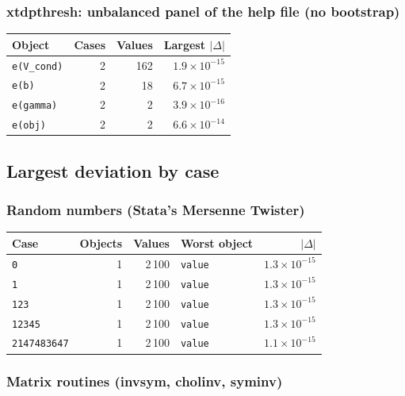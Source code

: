 \subsubsection*{xtdpthresh: unbalanced panel of the help file (no bootstrap)}

\begin{longtable}{@{}p{8.2cm}rrr@{}}
\toprule
Object & Cases & Values & Largest $|\Delta|$ \\
\midrule
\endhead
\texttt{e(V\_\allowbreak{}cond)} & 2 & 162 & $1.9\times10^{-15}$ \\
\texttt{e(b)} & 2 & 18 & $6.7\times10^{-15}$ \\
\texttt{e(gamma)} & 2 & 2 & $3.9\times10^{-16}$ \\
\texttt{e(obj)} & 2 & 2 & $6.6\times10^{-14}$ \\
\bottomrule
\end{longtable}

\subsection{Largest deviation by case}

\subsubsection*{Random numbers (Stata's Mersenne Twister)}

\begin{longtable}{@{}p{3.6cm}rrp{4.9cm}r@{}}
\toprule
Case & Objects & Values & Worst object & $|\Delta|$ \\
\midrule
\endhead
\texttt{0} & 1 & 2\,100 & \texttt{value} & $1.3\times10^{-15}$ \\
\texttt{1} & 1 & 2\,100 & \texttt{value} & $1.3\times10^{-15}$ \\
\texttt{123} & 1 & 2\,100 & \texttt{value} & $1.3\times10^{-15}$ \\
\texttt{12345} & 1 & 2\,100 & \texttt{value} & $1.3\times10^{-15}$ \\
\texttt{2147483647} & 1 & 2\,100 & \texttt{value} & $1.1\times10^{-15}$ \\
\bottomrule
\end{longtable}

\subsubsection*{Matrix routines (invsym, cholinv, syminv)}

